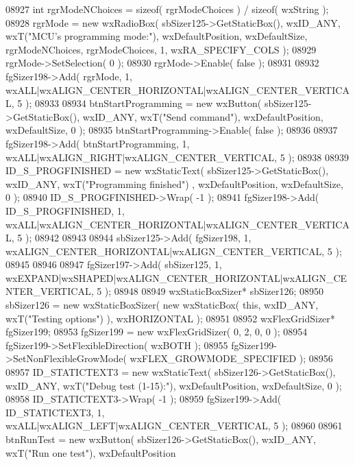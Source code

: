 \begin{DoxyCode}
08927     \textcolor{keywordtype}{int} rgrModeNChoices = \textcolor{keyword}{sizeof}( rgrModeChoices ) / \textcolor{keyword}{sizeof}( wxString );
08928     rgrMode = \textcolor{keyword}{new} wxRadioBox( sbSizer125->GetStaticBox(), wxID\_ANY, wxT(\textcolor{stringliteral}{"MCU's programming mode:"}), 
      wxDefaultPosition, wxDefaultSize, rgrModeNChoices, rgrModeChoices, 1, wxRA\_SPECIFY\_COLS );
08929     rgrMode->SetSelection( 0 );
08930     rgrMode->Enable( \textcolor{keyword}{false} );
08931     
08932     fgSizer198->Add( rgrMode, 1, wxALL|wxALIGN\_CENTER\_HORIZONTAL|wxALIGN\_CENTER\_VERTICAL, 5 );
08933     
08934     btnStartProgramming = \textcolor{keyword}{new} wxButton( sbSizer125->GetStaticBox(), wxID\_ANY, wxT(\textcolor{stringliteral}{"Send command"}), 
      wxDefaultPosition, wxDefaultSize, 0 );
08935     btnStartProgramming->Enable( \textcolor{keyword}{false} );
08936     
08937     fgSizer198->Add( btnStartProgramming, 1, wxALL|wxALIGN\_RIGHT|wxALIGN\_CENTER\_VERTICAL, 5 );
08938     
08939     ID_S_PROGFINISHED = \textcolor{keyword}{new} wxStaticText( sbSizer125->GetStaticBox(), wxID\_ANY, wxT(\textcolor{stringliteral}{"Programming finished"})
      , wxDefaultPosition, wxDefaultSize, 0 );
08940     ID_S_PROGFINISHED->Wrap( -1 );
08941     fgSizer198->Add( ID_S_PROGFINISHED, 1, wxALL|wxALIGN\_CENTER\_HORIZONTAL|wxALIGN\_CENTER\_VERTICAL, 5 );
08942     
08943     
08944     sbSizer125->Add( fgSizer198, 1, wxALIGN\_CENTER\_HORIZONTAL|wxALIGN\_CENTER\_VERTICAL, 5 );
08945     
08946     
08947     fgSizer197->Add( sbSizer125, 1, wxEXPAND|wxSHAPED|wxALIGN\_CENTER\_HORIZONTAL|wxALIGN\_CENTER\_VERTICAL, 5 
      );
08948     
08949     wxStaticBoxSizer* sbSizer126;
08950     sbSizer126 = \textcolor{keyword}{new} wxStaticBoxSizer( \textcolor{keyword}{new} wxStaticBox( \textcolor{keyword}{this}, wxID\_ANY, wxT(\textcolor{stringliteral}{"Testing options"}) ), 
      wxHORIZONTAL );
08951     
08952     wxFlexGridSizer* fgSizer199;
08953     fgSizer199 = \textcolor{keyword}{new} wxFlexGridSizer( 0, 2, 0, 0 );
08954     fgSizer199->SetFlexibleDirection( wxBOTH );
08955     fgSizer199->SetNonFlexibleGrowMode( wxFLEX\_GROWMODE\_SPECIFIED );
08956     
08957     ID_STATICTEXT3 = \textcolor{keyword}{new} wxStaticText( sbSizer126->GetStaticBox(), wxID\_ANY, wxT(\textcolor{stringliteral}{"Debug test (1-15):"}), 
      wxDefaultPosition, wxDefaultSize, 0 );
08958     ID_STATICTEXT3->Wrap( -1 );
08959     fgSizer199->Add( ID_STATICTEXT3, 1, wxALL|wxALIGN\_LEFT|wxALIGN\_CENTER\_VERTICAL, 5 );
08960     
08961     btnRunTest = \textcolor{keyword}{new} wxButton( sbSizer126->GetStaticBox(), wxID\_ANY, wxT(\textcolor{stringliteral}{"Run one test"}), wxDefaultPosition

\end{DoxyCode}
